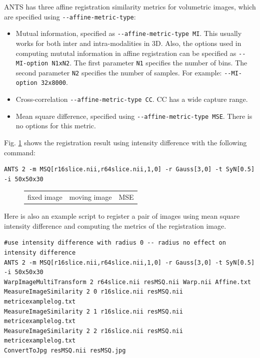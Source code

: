\documentclass{InsightArticle}
\begin{document}
ANTS has three affine registration similarity metrics for volumetric images, which are specified using \verb"--affine-metric-type":
\begin{itemize}
    \item Mutual information, specified as \verb"--affine-metric-type MI". This usually works for both inter and intra-modalities in 3D. Also, the options used in computing mututal information in affine registration can be specified as \verb"--MI-option N1xN2". The first parameter \verb"N1" specifies the number of bins. The second parameter \verb"N2" specifies the number of samples. For example: \verb"--MI-option 32x8000".
    \item Cross-correlation  \verb"--affine-metric-type CC".  CC has a
      wide capture range.  
    \item Mean square difference, specified using \verb"--affine-metric-type MSE". There is no options for this metric.
\end{itemize}

Fig. \ref{fig:metric_example} shows the registration result using intensity difference with the following command:
\begin{verbatim}
ANTS 2 -m MSQ[r16slice.nii,r64slice.nii,1,0] -r Gauss[3,0] -t SyN[0.5] -i 50x50x30
\end{verbatim}

\begin{figure}
    \label{fig:metric_example}
    \centering
    \begin{tabular}[h]{c|c|c}
        fixed image &
        moving image & 
        MSE  \\
    \end{tabular} 
\end{figure}
Here is also an example script to register a pair of images using mean square intensity difference and computing the metrics of the registration image.
\begin{verbatim}
#use intensity difference with radius 0 -- radius no effect on intensity difference
ANTS 2 -m MSQ[r16slice.nii,r64slice.nii,1,0] -r Gauss[3,0] -t SyN[0.5] -i 50x50x30
WarpImageMultiTransform 2 r64slice.nii resMSQ.nii Warp.nii Affine.txt
MeasureImageSimilarity 2 0 r16slice.nii resMSQ.nii metricexamplelog.txt
MeasureImageSimilarity 2 1 r16slice.nii resMSQ.nii metricexamplelog.txt
MeasureImageSimilarity 2 2 r16slice.nii resMSQ.nii metricexamplelog.txt
ConvertToJpg resMSQ.nii resMSQ.jpg
\end{verbatim}
\end{document}
